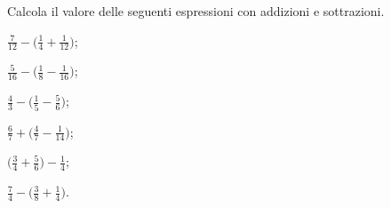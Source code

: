 \begin{esercizio}[\Ast]
 \label{ese:3.129}
 Calcola il valore delle seguenti espressioni con addizioni e sottrazioni.
\begin{multicols}{2}
\begin{enumeratea}
\spazielenx
\item $\displaystyle{\frac{7}{12}-\bigg(\frac{1}{4}+\frac{1}{12}\bigg)}$;
\item $\displaystyle{\frac{5}{16}-\bigg(\frac{1}{8}-\frac{1}{16}\bigg)}$;
\item $\displaystyle{\frac{4}{3}-\bigg(\frac{1}{5}-\frac{5}{6}\bigg)}$;
\item $\displaystyle{\frac{6}{7}+\bigg(\frac{4}{7}-\frac{1}{14}\bigg)}$;
\item $\displaystyle{\bigg(\frac{3}{4}+\frac{5}{6}\bigg)-\frac{1}{4}}$;
\item $\displaystyle{\frac{7}{4}-\bigg(\frac{3}{8}+\frac{1}{4}\bigg)}$.
\end{enumeratea}
\end{multicols}
\end{esercizio}

